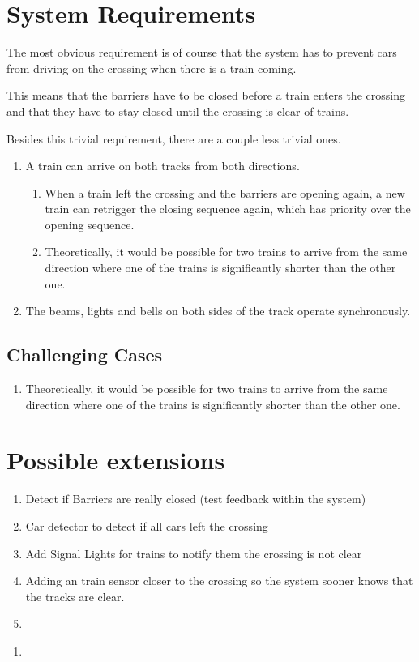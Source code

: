 \documentclass[final]{report}
\begin{document}
\section{System Requirements}
The most obvious requirement is of course that the system has to prevent cars from driving on the crossing when there is a train coming.

This means that the barriers have to be closed before a train enters the crossing and that they have to stay closed until the crossing is clear of trains.

Besides this trivial requirement, there are a couple less trivial ones.
\begin{enumerate}
\item A train can arrive on both tracks from both directions.
	\begin{enumerate}
	\item When a train left the crossing and the barriers are opening again, a new train can retrigger the closing sequence again, which has priority over the opening sequence. %
	\item Theoretically, it would be possible for two trains to arrive from the same direction where one of the trains is significantly shorter than the other one. %
	\end{enumerate}

\item The beams, lights and bells on both sides of the track operate synchronously.
\end{enumerate}


\subsection{Challenging Cases}
	\begin{enumerate}
		\item Theoretically, it would be possible for two trains to arrive from the same direction where one of the trains is significantly shorter than the other one.

	\end{enumerate}

\section{Possible extensions}
\begin{enumerate}
\item Detect if Barriers are really closed (test feedback within the system)
\item Car detector to detect if all cars left the crossing
\item Add Signal Lights for trains to notify them the crossing is not clear
\item Adding an train sensor closer to the crossing so the system sooner knows that the tracks are clear.
\item 
\end{enumerate}



\begin{enumerate}
\item 
\end{enumerate}
\end{document}
